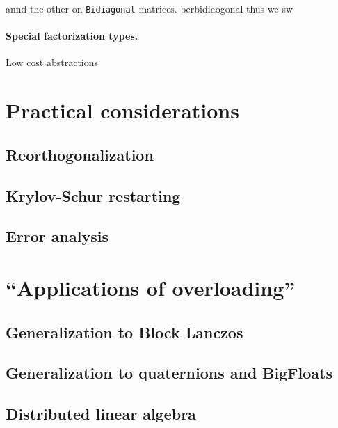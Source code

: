\documentclass[final,leqno]{siamltex1213}
\begin{document}
annd the other on \verb|Bidiagonal| matrices. berbidiaogonal thus we
sw



\paragraph{Special factorization types.}
Low cost abstractions


\section{Practical considerations}


\subsection{Reorthogonalization}



\subsection{Krylov-Schur restarting}



\subsection{Error analysis}



\section{``Applications of overloading''}

\subsection{Generalization to Block Lanczos}


\subsection{Generalization to quaternions and BigFloats}


\subsection{Distributed linear algebra}
\end{document}
